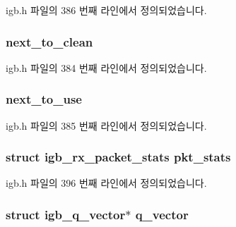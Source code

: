 igb.\+h 파일의 386 번째 라인에서 정의되었습니다.

\subsubsection[{\texorpdfstring{next\+\_\+to\+\_\+clean}{next_to_clean}}]{ next\+\_\+to\+\_\+clean}\hypertarget{structigb__ring_a2f5b83762c03fc911cd5b870f4ac8b72}{}\label{structigb__ring_a2f5b83762c03fc911cd5b870f4ac8b72}


igb.\+h 파일의 384 번째 라인에서 정의되었습니다.

\subsubsection[{\texorpdfstring{next\+\_\+to\+\_\+use}{next_to_use}}]{ next\+\_\+to\+\_\+use}\hypertarget{structigb__ring_a2684bbc8d097b888120edb2fb35b00f3}{}\label{structigb__ring_a2684bbc8d097b888120edb2fb35b00f3}


igb.\+h 파일의 385 번째 라인에서 정의되었습니다.

\subsubsection[{\texorpdfstring{pkt\+\_\+stats}{pkt_stats}}]{\setlength{\rightskip}{0pt plus 5cm}struct {\bf igb\+\_\+rx\+\_\+packet\+\_\+stats} pkt\+\_\+stats}\hypertarget{structigb__ring_a2e15daa5af2b0e45c95d5f2573a96815}{}\label{structigb__ring_a2e15daa5af2b0e45c95d5f2573a96815}


igb.\+h 파일의 396 번째 라인에서 정의되었습니다.

\subsubsection[{\texorpdfstring{q\+\_\+vector}{q_vector}}]{\setlength{\rightskip}{0pt plus 5cm}struct {\bf igb\+\_\+q\+\_\+vector}$\ast$ q\+\_\+vector}\hypertarget{structigb__ring_aa100c4670cf68cffe85570de281b83ce}{}\label{structigb__ring_aa100c4670cf68cffe85570de281b83ce}


